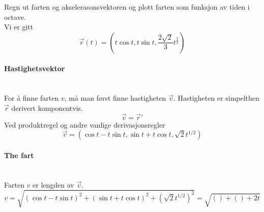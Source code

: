 Regn ut farten og akselerasonsvektoren
og plott farten som funksjon av tiden i octave.\\

Vi er gitt
$$\vec{r}(t) = (t\cos{t},t\sin{t},\frac{2 \sqrt{2}}{3}t^{\frac{3}{2}})$$

\paragraph{Hastighetsvektor} \mbox{} \\
For å finne farten $v$, må man først finne hastigheten $\vec{v}$.
Hastigheten er simpelthen $\vec{r}$ derivert komponentvis.
$$\vec{v} = \vec{r}'$$
Ved produktregel og andre vanlige derivasjonsregler
$$\vec{v} = (\cos{t}-t\sin{t}, \sin{t}+t\cos{t},\sqrt{2}t^{1/2})$$

\paragraph{The fart} \mbox{} \\
Farten $v$ er lengden av $\vec{v}$.
$$v = \sqrt{(\cos{t}-t\sin{t})^2 + (\sin{t}+t\cos{t})^2 + (\sqrt{2}t^{1/2})^2}
= \sqrt{() + () + 2t}$$
